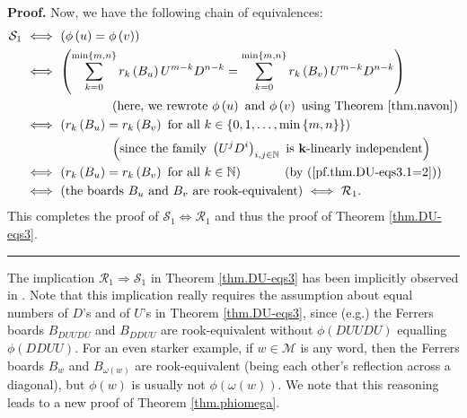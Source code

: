 \documentclass[numbers=enddot,12pt,final,onecolumn,notitlepage]{scrartcl}%
\theoremstyle{definition}
\newenvironment{proof}[1][Proof]{\noindent\textbf{#1.} }{\ \rule{0.5em}{0.5em}}
\newcommand{\M}{\mathcal{M}}
\newcommand{\kk}{\mathbf{k}}
\newcommand{\NN}{\mathbb{N}}
\begin{document}
\begin{proof}
Now, we have the following chain of equivalences:%
\begin{align*}
\mathcal{S}_{1}\   & \Longleftrightarrow\ \left(  \phi\left(  u\right)
=\phi\left(  v\right)  \right)  \\
& \Longleftrightarrow\ \left(  \sum_{k=0}^{\min\left\{  m,n\right\}  }%
r_{k}\left(  B_{u}\right)  U^{m-k}D^{n-k}=\sum_{k=0}^{\min\left\{
m,n\right\}  }r_{k}\left(  B_{v}\right)  U^{m-k}D^{n-k}\right)  \\
& \ \ \ \ \ \ \ \ \ \ \ \ \ \ \ \ \ \ \ \ \left(  \text{here, we rewrote }%
\phi\left(  u\right)  \text{ and }\phi\left(  v\right)  \text{ using Theorem
\ref{thm.navon}}\right)  \\
& \Longleftrightarrow\ \left(  r_{k}\left(  B_{u}\right)  =r_{k}\left(
B_{v}\right)  \text{ for all }k\in\left\{  0,1,\ldots,\min\left\{
m,n\right\}  \right\}  \right)  \\
& \ \ \ \ \ \ \ \ \ \ \ \ \ \ \ \ \ \ \ \ \left(  \text{since the family
}\left(  U^{j}D^{i}\right)  _{i,j\in\NN}\text{ is }\kk%
\text{-linearly independent}\right)  \\
& \Longleftrightarrow\ \left(  r_{k}\left(  B_{u}\right)  =r_{k}\left(
B_{v}\right)  \text{ for all }k\in\NN\right)
\ \ \ \ \ \ \ \ \ \ \left(  \text{by (\ref{pf.thm.DU-eqs3.1=2})}\right)  \\
& \Longleftrightarrow\ \left(  \text{the boards }B_{u}\text{ and }B_{v}\text{
are rook-equivalent}\right)  \ \Longleftrightarrow\ \mathcal{R}_1.
\end{align*}
This completes the proof of $\mathcal{S}_{1}\Longleftrightarrow\mathcal{R}_1$ and thus the proof of Theorem \ref{thm.DU-eqs3}.
\end{proof}

The implication $\mathcal{R}_1\Longrightarrow\mathcal{S}_{1}$ in Theorem
\ref{thm.DU-eqs3} has been implicitly observed in \cite[bottom of p.
40]{BCHR11}. Note that this implication really requires the assumption about
equal numbers of $D$'s and of $U$'s in Theorem \ref{thm.DU-eqs3}, since (e.g.)
the Ferrers boards $B_{DUUDU}$ and $B_{DDUU}$ are rook-equivalent without
$\phi\left(  DUUDU\right)  $ equalling $\phi\left(  DDUU\right)  $. For an
even starker example, if $w\in\M$ is any word, then the Ferrers
boards $B_{w}$ and $B_{\omega\left(  w\right)  }$ are rook-equivalent (being
each other's reflection across a diagonal), but $\phi\left(  w\right)  $ is
usually not $\phi\left(  \omega\left(  w\right)  \right)  $. We note that this reasoning leads to a new proof of Theorem \ref{thm.phiomega}.
\end{document}
